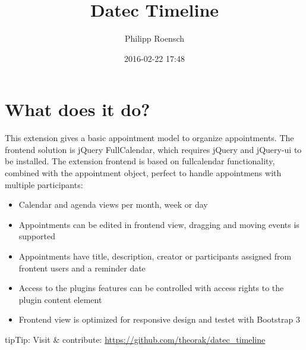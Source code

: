 \documentclass[a4paper,10pt,english]{sphinxmanual}
\title{Datec Timeline}
\date{2016-02-22 17:48}
\author{Philipp Roensch}
\begin{document}
\maketitle
\tableofcontents
{}\label{Index::doc}



\chapter{What does it do?}
\label{Introduction/Index:start}\label{Introduction/Index:datec-timeline}\label{Introduction/Index::doc}\label{Introduction/Index:what-does-it-do}\label{Introduction/Index:introduction}
This extension gives a basic appointment model to organize appointments. The frontend solution is jQuery FullCalendar, which requires jQuery and jQuery-ui to be installed.
The extension frontend is based on fullcalendar functionality, combined with the appointment object, perfect to handle appointmens with multiple participants:
\begin{itemize}
\item {} 
Calendar and agenda views per month, week or day

\item {} 
Appointments can be edited in frontend view, dragging and moving events is supported

\item {} 
Appointments have title, description, creator or participants assigned from frontent users and a reminder date

\item {} 
Access to the plugins features can be controlled with access rights to the plugin content element

\item {} 
Frontend view is optimized for responsive design and testet with Bootstrap 3

\end{itemize}

\begin{notice}{tip}{Tip:}
Visit \& contribute: \href{https://github.com/theorak/datec\_timeline}{https://github.com/theorak/datec\_timeline}
\end{notice}
\end{document}

